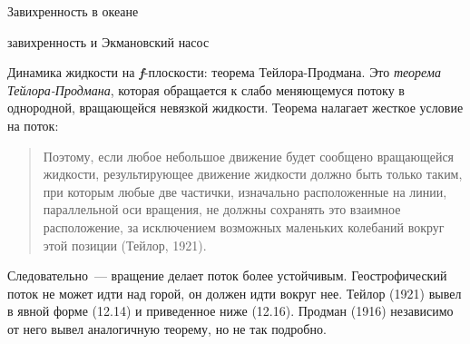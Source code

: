 \begin{chapter}{Завихренность в океане}
\begin{section}{завихренность и Экмановский насос}
\begin{paragraph}{Динамика жидкости на \textbf{\textit{f}}-плоскости: 
теорема Тейлора-Продмана.}
Это \emph{теорема Тейлора-Продмана}, которая обращается к слабо меняющемуся
потоку в однородной, вращающейся невязкой жидкости. Теорема налагает
жесткое условие на поток:
\begin{quotation}
Поэтому, если любое небольшое движение будет сообщено вращающейся
жидкости, результирующее движение жидкости должно быть только таким,
при которым любые две частички, изначально расположенные на линии,
параллельной оси вращения, не должны сохранять это взаимное
расположение, за исключением возможных маленьких колебаний вокруг этой
позиции (Тейлор, 1921).
\end{quotation}
Следовательно~--- вращение делает поток более
устойчивым. Геострофический поток не может идти над горой, он должен
идти вокруг нее. Тейлор (1921) вывел в явной форме (12.14) и
приведенное ниже (12.16). Продман (1916) независимо от него вывел
аналогичную теорему, но не так подробно.
%


\end{paragraph}
\end{section}
\end{chapter}
